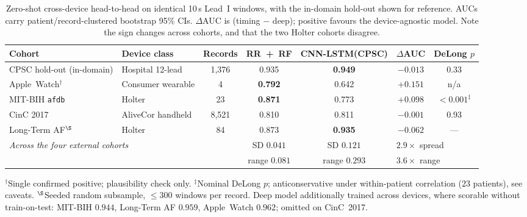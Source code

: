 \documentclass[]{ws-procs9x6}
\begin{document}
\begin{table}[t]
\centering
\caption{Zero-shot cross-device head-to-head on identical 10\,s Lead~I windows,
with the in-domain hold-out shown for reference. AUCs carry patient/record-clustered
bootstrap 95\% CIs. $\Delta$AUC is (timing $-$ deep); positive favours the
device-agnostic model. Note the sign changes across cohorts, and that the two
Holter cohorts disagree.}
\label{tab:crossdevice}
\small
\begin{tabular}{llccccc}
\toprule
Cohort & Device class & Records & RR~+~RF & CNN-LSTM(CPSC) & $\Delta$AUC & DeLong $p$ \\
\midrule
CPSC hold-out (in-domain) & Hospital 12-lead & 1{,}376 & 0.935 & \textbf{0.949} & $-0.013$ & 0.33 \\
\midrule
Apple~Watch$^{\dagger}$ & Consumer wearable & 4 & \textbf{0.792} & 0.642 & $+0.151$ & n/a \\
MIT-BIH \texttt{afdb} & Holter & 23 & \textbf{0.871} & 0.773 & $+0.098$ & $<0.001^{\ddagger}$ \\
CinC 2017 & AliveCor handheld & 8{,}521 & 0.810 & 0.811 & $-0.001$ & 0.93 \\
Long-Term AF$^{\S}$ & Holter & 84 & 0.873 & \textbf{0.935} & $-0.062$ & --- \\
\midrule
\multicolumn{3}{l}{\emph{Across the four external cohorts}}
 & SD $0.041$ & SD $0.121$ & \multicolumn{2}{l}{$2.9\times$ spread} \\
\multicolumn{3}{l}{}
 & range $0.081$ & range $0.293$ & \multicolumn{2}{l}{$3.6\times$ range} \\
\bottomrule
\end{tabular}

\vspace{2pt}
{\footnotesize $^{\dagger}$Single confirmed positive; plausibility check only.
$^{\ddagger}$Nominal DeLong $p$; anticonservative under within-patient correlation
($23$ patients), see caveats. $^{\S}$Seeded random subsample, $\le300$ windows per
record. Deep model additionally trained across devices, where scorable without
train-on-test: MIT-BIH $0.944$, Long-Term AF $0.959$, Apple~Watch $0.962$;
omitted on CinC~2017.}
\end{table}
\end{document}
